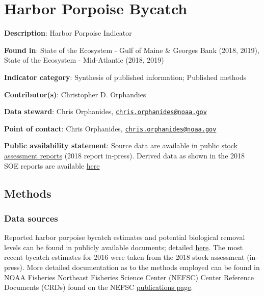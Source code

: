 \documentclass[
]{book}
\begin{document}
\hypertarget{harbor-porpoise-bycatch}{%
\chapter{Harbor Porpoise Bycatch}\label{harbor-porpoise-bycatch}}

\textbf{Description}: Harbor Porpoise Indicator

\textbf{Found in}: State of the Ecosystem - Gulf of Maine \& Georges Bank (2018, 2019), State of the Ecosystem - Mid-Atlantic (2018, 2019)

\textbf{Indicator category}: Synthesis of published information; Published methods

\textbf{Contributor(s)}: Christopher D. Orphandies

\textbf{Data steward}: Chris Orphanides, \href{mailto:chris.orphanides@noaa.gov}{\nolinkurl{chris.orphanides@noaa.gov}}

\textbf{Point of contact}: Chris Orphanides, \href{mailto:chris.orphanides@noaa.gov}{\nolinkurl{chris.orphanides@noaa.gov}}

\textbf{Public availability statement}: Source data are available in public \href{https://www.fisheries.noaa.gov/national/marine-mammal-protection/marine-mammal-stock-assessment-reports-region}{stock assessment reports} (2018 report in-press). Derived data as shown in the 2018 SOE reports are available \href{http://comet.nefsc.noaa.gov/erddap/tabledap/protected_species_soe_v1.html}{here}

\hypertarget{methods-18}{%
\section{Methods}\label{methods-18}}

\hypertarget{data-sources-18}{%
\subsection{Data sources}\label{data-sources-18}}

Reported harbor porpoise bycatch estimates and potential biological removal levels can be found in publicly available documents; detailed \href{https://www.fisheries.noaa.gov/national/marine-mammal-protection/marine-mammal-stock-assessment-reports-region}{here}. The most recent bycatch estimates for 2016 were taken from the 2018 stock assessment (in-press). More detailed documentation as to the methods employed can be found in NOAA Fisheries Northeast Fisheries Science Center (NEFSC) Center Reference Documents (CRDs) found on the NEFSC \href{https://www.nefsc.noaa.gov/publications/crd/}{publications page}.
\end{document}
